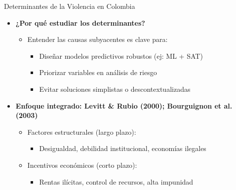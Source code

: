 \begin{frame}{Determinantes de la Violencia en Colombia}
    \begin{itemize}
        \item \textbf{¿Por qué estudiar los determinantes?}
        \begin{itemize}
            \item Entender las causas subyacentes es clave para:
            \begin{itemize}
                \item Diseñar modelos predictivos robustos (ej: ML + SAT)
                \item Priorizar variables en análisis de riesgo
                \item Evitar soluciones simplistas o descontextualizadas
            \end{itemize}
        \end{itemize}
        
        \vspace{0.4cm}
        
        \item \textbf{Enfoque integrado: Levitt \& Rubio (2000); Bourguignon et al. (2003)}
        \begin{itemize}
            \item \alert{Factores estructurales} (largo plazo):
            \begin{itemize}
                \item Desigualdad, debilidad institucional, economías ilegales
            \end{itemize}
            
            \item \alert{Incentivos económicos} (corto plazo):
            \begin{itemize}
                \item Rentas ilícitas, control de recursos, alta impunidad
            \end{itemize}
        \end{itemize}
    \end{itemize}

\end{frame}